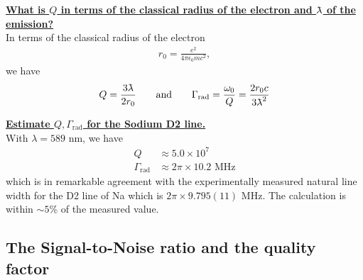 \documentclass{book}
\theoremstyle{definition}
\newcommand{\lambdabar}{{\mkern0.75mu\mathchar '26\mkern -9.75mu\lambda}}
\newcommand{\f}[2]{\frac{#1}{#2}}
\begin{document}
\noindent \textbf{\underline{What is $Q$ in terms of the classical radius of the electron and $\lambdabar $ of the emission?}}\\


In terms of the classical radius of the electron
\begin{align*}
r_0 = \f{e^2}{4\pi \epsilon_0 mc^2}, 
\end{align*}
we have
\begin{align*}
Q = \f{3\lambdabar}{2r_0} \quad\quad \text{and}\quad\quad \Gamma_\text{rad} = \f{\omega_0}{Q} = \f{2r_0c}{3\lambdabar^2}
\end{align*}




\noindent \textbf{\underline{Estimate $Q,\Gamma_\text{rad}$ for the Sodium D2 line.}}\\



With $\lambda = 589 $ nm, we have
\begin{align*}
Q &\approx 5.0 \times 10^7 \\
\Gamma_\text{rad} &\approx 2\pi \times 10.2 \text{ MHz}
\end{align*}
which is in remarkable agreement with the experimentally measured natural line width for the D2 line of Na which is $2\pi \times 9.795(11)$ MHz. The calculation is within $\sim 5$\% of the measured value.  





\subsection{The Signal-to-Noise ratio and the quality factor}
\end{document}
